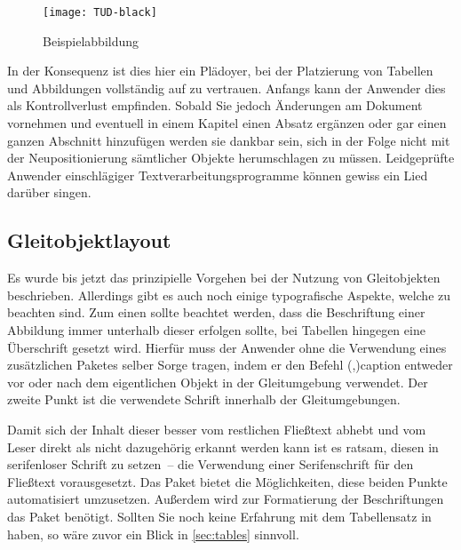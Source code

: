 \documentclass[%
  english,ngerman,%
  cdgeometry=no,DIV=12,%
  cd=false,cdfont=false,cdtitle=true,%
  headings=normal,%
  automark,%
  listof=toc,%
]{tudscrartcl}
\begin{document}
\begin{Trunk}
\begin{figure}
\centering
\texttt{[image: TUD-black]}
\caption{Beispielabbildung\label{fig:example}}
\end{figure}

\end{Trunk}
\InputCode\noindent
%
In der Konsequenz ist dies hier ein Plädoyer, bei der Platzierung von Tabellen 
und Abbildungen vollständig auf  zu vertrauen. Anfangs kann 
der Anwender dies als Kontrollverlust empfinden. Sobald Sie jedoch Änderungen 
am Dokument vornehmen und eventuell in einem Kapitel einen Absatz ergänzen oder 
gar einen ganzen Abschnitt hinzufügen werden sie dankbar sein, sich in der 
Folge nicht mit der Neupositionierung sämtlicher Objekte herumschlagen zu 
müssen. Leidgeprüfte Anwender einschlägiger Textverarbeitungsprogramme können 
gewiss ein Lied darüber singen.



\subsection{%
  Gleitobjektlayout%
  \label{sec:floatlayout}%
}

Es wurde bis jetzt das prinzipielle Vorgehen bei der Nutzung von Gleitobjekten 
beschrieben. Allerdings gibt es auch noch einige typografische Aspekte, welche 
zu beachten sind. Zum einen sollte beachtet werden, dass die Beschriftung einer 
Abbildung immer unterhalb dieser erfolgen sollte, bei Tabellen hingegen eine 
Überschrift gesetzt wird. Hierfür muss der Anwender ohne die Verwendung eines 
zusätzlichen Paketes selber Sorge tragen, indem er den Befehl 
\Macro(,){caption} entweder vor oder 
nach dem eigentlichen Objekt in der Gleitumgebung verwendet. Der zweite Punkt 
ist die verwendete Schrift innerhalb der Gleitumgebungen. 

Damit sich der Inhalt dieser besser vom restlichen Fließtext abhebt und vom 
Leser direkt als nicht dazugehörig erkannt werden kann ist es ratsam, diesen in 
serifenloser Schrift zu setzen~-- die Verwendung einer Serifenschrift für den 
Fließtext vorausgesetzt. Das Paket  bietet die Möglichkeiten, 
diese beiden Punkte automatisiert umzusetzen. Außerdem wird zur Formatierung 
der Beschriftungen das Paket  benötigt. Sollten Sie noch keine 
Erfahrung mit dem Tabellensatz in  haben, so wäre zuvor ein 
Blick in \autoref{sec:tables} sinnvoll. 
\end{document}
